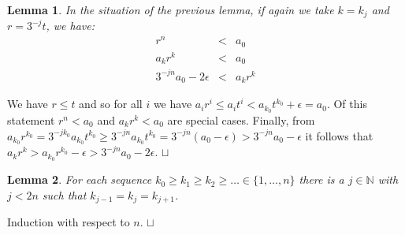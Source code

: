 \documentclass{article}
\def\NN{\mathbb{N}}
\newtheorem{lemma}{Lemma}
\newenvironment{proof}{\trivlist \item[\hskip \labelsep{\bf Proof$\,$}]}{\hfill\rlap{$\sqcap$}$\sqcup$\par}
\begin{document}
\begin{lemma}\label{lemma:bou}
In the situation of the previous lemma, if again we take $k = k_j$ and $r = 3^{-j} t$, we have:
\begin{eqnarray*}
r^n &<& a_0\\
a_k r^k &<& a_0\\
3^{-jn} a_0 - 2\epsilon &<& a_k r^k
\end{eqnarray*}
\end{lemma}
\begin{proof}
We have $r \le t$ and so for all $i$ we have $a_i r^i \le a_i t^i < a_{k_0} t^{k_0} + \epsilon = a_0$.
Of this statement $r^n < a_0$ and $a_k r^k < a_0$ are special cases.
Finally, from $a_{k_0} r^{k_0} = 3^{-jk_0} a_{k_0} t^{k_0} \ge 3^{-jn} a_{k_0} t^{k_0} =
3^{-jn} (a_0 - \epsilon) > 3^{-jn} a_0 - \epsilon$ it follows that
$a_k r^k > a_{k_0} r^{k_0} - \epsilon > 3^{-jn} a_0 - 2\epsilon$.
\end{proof}

\begin{lemma}\label{lemma:sel}
For each sequence $k_0 \ge k_1 \ge k_2 \ge \ldots\in\{1,\ldots,n\}$ there is
a $j\in\NN$ with $j < 2n$ such that $k_{j-1} = k_j = k_{j+1}$.
\end{lemma}
\begin{proof}
Induction with respect to $n$.
\end{proof}
\end{document}
